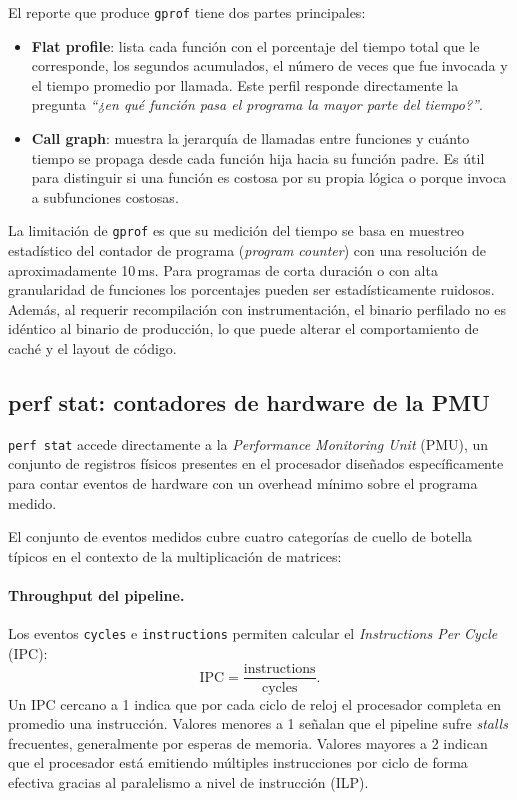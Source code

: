 El reporte que produce \texttt{gprof} tiene dos partes principales:

\begin{itemize}
    \item \textbf{Flat profile}: lista cada función con el porcentaje del tiempo total
        que le corresponde, los segundos acumulados, el número de veces que fue
        invocada y el tiempo promedio por llamada.
        Este perfil responde directamente la pregunta \textit{``¿en qué función
        pasa el programa la mayor parte del tiempo?''}.
    \item \textbf{Call graph}: muestra la jerarquía de llamadas entre funciones y
        cuánto tiempo se propaga desde cada función hija hacia su función padre.
        Es útil para distinguir si una función es costosa por su propia lógica o
        porque invoca a subfunciones costosas.
\end{itemize}

La limitación de \texttt{gprof} es que su medición del tiempo se basa
en muestreo estadístico del contador de programa (\textit{program counter}) con
una resolución de aproximadamente 10\,ms.
Para programas de corta duración o con alta granularidad de funciones los
porcentajes pueden ser estadísticamente ruidosos.
Además, al requerir recompilación con instrumentación, el binario perfilado no es
idéntico al binario de producción, lo que puede alterar el comportamiento de caché
y el layout de código.


\subsection{perf stat: contadores de hardware de la PMU}

\texttt{perf stat} accede directamente a la \textit{Performance Monitoring Unit}
(PMU), un conjunto de registros físicos presentes en el procesador
diseñados específicamente para contar eventos de hardware con un overhead
mínimo sobre el programa medido.

El conjunto de eventos medidos cubre cuatro categorías de cuello de botella típicos
en el contexto de la multiplicación de matrices:

\paragraph{Throughput del pipeline.}
Los eventos \texttt{cycles} e \texttt{instructions} permiten calcular el
\textit{Instructions Per Cycle} (IPC):
\begin{equation}
    \text{IPC} = \frac{\text{instructions}}{\text{cycles}}.
\end{equation}
Un IPC cercano a 1 indica que por cada ciclo de reloj el procesador completa en
promedio una instrucción.
Valores menores a 1 señalan que el pipeline sufre \textit{stalls} frecuentes,
generalmente por esperas de memoria.
Valores mayores a 2 indican que el procesador está emitiendo múltiples
instrucciones por ciclo de forma efectiva gracias al paralelismo a nivel de
instrucción (ILP).

